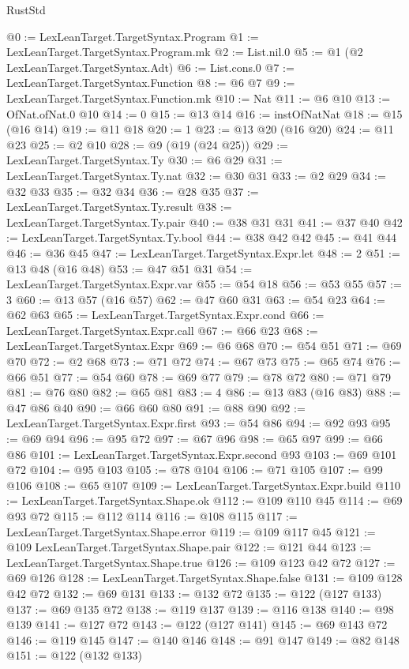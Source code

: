 \begin{lexlean}{RustStd}
\begin{coremodule}
@0 := LexLeanTarget.TargetSyntax.Program
@1 := LexLeanTarget.TargetSyntax.Program.mk
@2 := List.nil.{0}
@5 := @1 (@2 LexLeanTarget.TargetSyntax.Adt)
@6 := List.cons.{0}
@7 := LexLeanTarget.TargetSyntax.Function
@8 := @6 @7
@9 := LexLeanTarget.TargetSyntax.Function.mk
@10 := Nat
@11 := @6 @10
@13 := OfNat.ofNat.{0} @10
@14 := 0
@15 := @13 @14
@16 := instOfNatNat
@18 := @15 (@16 @14)
@19 := @11 @18
@20 := 1
@23 := @13 @20 (@16 @20)
@24 := @11 @23
@25 := @2 @10
@28 := @9 (@19 (@24 @25))
@29 := LexLeanTarget.TargetSyntax.Ty
@30 := @6 @29
@31 := LexLeanTarget.TargetSyntax.Ty.nat
@32 := @30 @31
@33 := @2 @29
@34 := @32 @33
@35 := @32 @34
@36 := @28 @35
@37 := LexLeanTarget.TargetSyntax.Ty.result
@38 := LexLeanTarget.TargetSyntax.Ty.pair
@40 := @38 @31 @31
@41 := @37 @40
@42 := LexLeanTarget.TargetSyntax.Ty.bool
@44 := @38 @42 @42
@45 := @41 @44
@46 := @36 @45
@47 := LexLeanTarget.TargetSyntax.Expr.let
@48 := 2
@51 := @13 @48 (@16 @48)
@53 := @47 @51 @31
@54 := LexLeanTarget.TargetSyntax.Expr.var
@55 := @54 @18
@56 := @53 @55
@57 := 3
@60 := @13 @57 (@16 @57)
@62 := @47 @60 @31
@63 := @54 @23
@64 := @62 @63
@65 := LexLeanTarget.TargetSyntax.Expr.cond
@66 := LexLeanTarget.TargetSyntax.Expr.call
@67 := @66 @23
@68 := LexLeanTarget.TargetSyntax.Expr
@69 := @6 @68
@70 := @54 @51
@71 := @69 @70
@72 := @2 @68
@73 := @71 @72
@74 := @67 @73
@75 := @65 @74
@76 := @66 @51
@77 := @54 @60
@78 := @69 @77
@79 := @78 @72
@80 := @71 @79
@81 := @76 @80
@82 := @65 @81
@83 := 4
@86 := @13 @83 (@16 @83)
@88 := @47 @86 @40
@90 := @66 @60 @80
@91 := @88 @90
@92 := LexLeanTarget.TargetSyntax.Expr.first
@93 := @54 @86
@94 := @92 @93
@95 := @69 @94
@96 := @95 @72
@97 := @67 @96
@98 := @65 @97
@99 := @66 @86
@101 := LexLeanTarget.TargetSyntax.Expr.second @93
@103 := @69 @101 @72
@104 := @95 @103
@105 := @78 @104
@106 := @71 @105
@107 := @99 @106
@108 := @65 @107
@109 := LexLeanTarget.TargetSyntax.Expr.build
@110 := LexLeanTarget.TargetSyntax.Shape.ok
@112 := @109 @110 @45
@114 := @69 @93 @72
@115 := @112 @114
@116 := @108 @115
@117 := LexLeanTarget.TargetSyntax.Shape.error
@119 := @109 @117 @45
@121 := @109 LexLeanTarget.TargetSyntax.Shape.pair
@122 := @121 @44
@123 := LexLeanTarget.TargetSyntax.Shape.true
@126 := @109 @123 @42 @72
@127 := @69 @126
@128 := LexLeanTarget.TargetSyntax.Shape.false
@131 := @109 @128 @42 @72
@132 := @69 @131
@133 := @132 @72
@135 := @122 (@127 @133)
@137 := @69 @135 @72
@138 := @119 @137
@139 := @116 @138
@140 := @98 @139
@141 := @127 @72
@143 := @122 (@127 @141)
@145 := @69 @143 @72
@146 := @119 @145
@147 := @140 @146
@148 := @91 @147
@149 := @82 @148
@151 := @122 (@132 @133)

\end{coremodule}
\end{lexlean}
